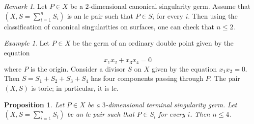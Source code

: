 \documentclass[11pt]{amsart}
\numberwithin{equation}{section}
\newtheorem{proposition}[thm]{Proposition}
\theoremstyle{definition}
\theoremstyle{remark}
\newtheorem{remark}[thm]{Remark}
\newtheorem{example}[thm]{Example}
\begin{document}
\begin{remark}
\label{rem-canonical-surface-boundedness}
Let $P\in X$ be a $2$-dimensional canonical singularity germ. 
Assume that $(X, S=\sum_{i=1}^n S_i)$ is an lc pair such that $P \in S_i$ for every $i$. 
Then using the classification of canonical singularities on surfaces, one can check that $n\leq 2$. 
\end{remark}

\begin{example}
Let $P\in X$ be the germ of an ordinary double point given by the equation 
\[
x_1 x_2 + x_3 x_4 = 0
\]
where $P$ is the origin. 
Consider a divisor $S$ on $X$ given by the equation $x_1x_2=0$. Then $S=S_1+S_2+S_3+S_4$ has four components passing through $P$. The pair $(X, S)$ is toric; in particular, it is lc.
\end{example}

\begin{proposition}
\label{prop-lc-bounded-number-of-components}
Let $P\in X$ be a $3$-dimensional terminal singularity germ. 
Let $(X, S=\sum_{i=1}^n S_i)$ be an lc pair such that $P \in S_i$ for every $i$. 
Then $n\leq 4$. 
\end{proposition}
\end{document}
